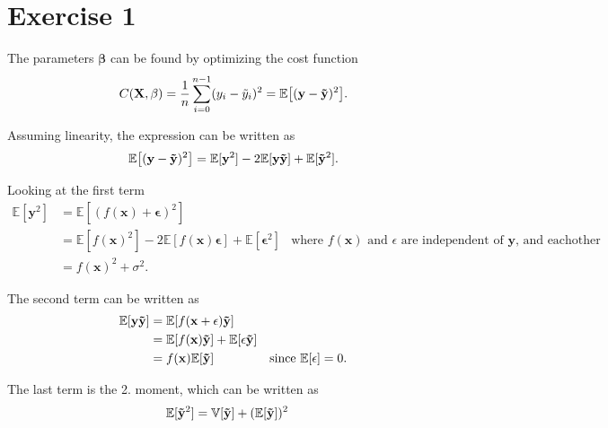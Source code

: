 \section{Exercise 1}\label{sec:ex1}
The parameters $\mathbf{\beta}$ can be found by optimizing the cost function
\begin{equation*}
    C(\mathbf{X}, \mathbf{\beta}) = \frac{1}{n} \sum_{i=0}^{n-1} ( y_{i} - \Tilde{y}_{i} )^{2} = \mathbb{E} \big[ ( \mathbf{y} - \mathbf{\Tilde{y}} )^{2} \big] .
\end{equation*}

Assuming linearity, the expression can be written as 
\begin{equation*}
    \mathbb{E} \big[ ( \mathbf{y} - \mathbf{\Tilde{y}} )^{2} \big] = \mathbb{E} [ \mathbf{y}^{2} ] - 2 \mathbb{E} [ \mathbf{y} \mathbf{\Tilde{y}} ] + \mathbb{E} [ \mathbf{\Tilde{y}}^{2} ].
\end{equation*}

Looking at the first term
\begin{align*}
    \mathbb{E} [ \mathbf{y}^{2} ] &= \mathbb{E} [ ( f(\mathbf{x}) + \mathbf{\epsilon} )^{2} ] \\
    &= \mathbb{E} [ f(\mathbf{x})^{2} ] - 2 \mathbb{E} [ f(\mathbf{x}) \mathbf{\epsilon} ] + \mathbb{E} [ \mathbf{\epsilon}^{2} ] & \text{where $f(\mathbf{x})$ and $\epsilon$ are independent of $\mathbf{y}$, and eachother} \\
    &= f(\mathbf{x})^{2} + \sigma^{2} .
\end{align*}

The second term can be written as 
\begin{align*}
    \mathbb{E} [ \mathbf{y} \mathbf{\Tilde{y}} ] &= \mathbb{E} [ f(\mathbf{x} + \mathbf{\epsilon}) \mathbf{\Tilde{y}} ] \\
    &= \mathbb{E} [ f(\mathbf{x}) \mathbf{\Tilde{y}} ] + \mathbb{E} [ \epsilon \mathbf{\Tilde{y}} ] \\
    &=  f(\mathbf{x}) \mathbb{E} [ \mathbf{\Tilde{y}} ] & \text{since $\mathbb{E}[\mathbf{\epsilon}] = 0$} .
\end{align*}

The last term is the 2. moment, which can be written as 
\begin{align*}
    \mathbb{E} [ \mathbf{\Tilde{y}}^{2} ] &= \mathbb{V}[\mathbf{\Tilde{y}}] + (\mathbb{E} [ \mathbf{\Tilde{y}} ])^{2} 
\end{align*}

